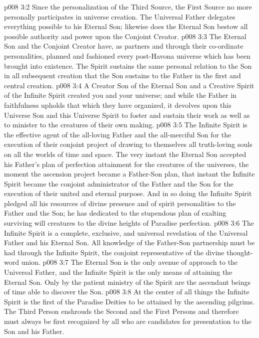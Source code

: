 \vs p008 3:2 Since the personalization of the Third Source, the First Source no more personally participates in universe creation. The Universal Father delegates everything possible to his Eternal Son; likewise does the Eternal Son bestow all possible authority and power upon the Conjoint Creator.
\vs p008 3:3 The Eternal Son and the Conjoint Creator have, as partners and through their co\hyp{}ordinate personalities, planned and fashioned every post\hyp{}Havona universe which has been brought into existence. The Spirit sustains the same personal relation to the Son in all subsequent creation that the Son sustains to the Father in the first and central creation.
\vs p008 3:4 A Creator Son of the Eternal Son and a Creative Spirit of the Infinite Spirit created you and your universe; and while the Father in faithfulness upholds that which they have organized, it devolves upon this Universe Son and this Universe Spirit to foster and sustain their work as well as to minister to the creatures of their own making.
\pc \vs p008 3:5 The Infinite Spirit is the effective agent of the all\hyp{}loving Father and the all\hyp{}merciful Son for the execution of their conjoint project of drawing to themselves all truth\hyp{}loving souls on all the worlds of time and space. The very instant the Eternal Son accepted his Father’s plan of perfection attainment for the creatures of the universes, the moment the ascension project became a Father\hyp{}Son plan, that instant the Infinite Spirit became the conjoint administrator of the Father and the Son for the execution of their united and eternal purpose. And in so doing the Infinite Spirit pledged all his resources of divine presence and of spirit personalities to the Father and the Son; he has dedicated  to the stupendous plan of exalting surviving will creatures to the divine heights of Paradise perfection.
\vs p008 3:6 The Infinite Spirit is a complete, exclusive, and universal revelation of the Universal Father and his Eternal Son. All knowledge of the Father\hyp{}Son partnership must be had through the Infinite Spirit, the conjoint representative of the divine thought\hyp{}word union.
\vs p008 3:7 The Eternal Son is the only avenue of approach to the Universal Father, and the Infinite Spirit is the only means of attaining the Eternal Son. Only by the patient ministry of the Spirit are the ascendant beings of time able to discover the Son.
\vs p008 3:8 At the center of all things the Infinite Spirit is the first of the Paradise Deities to be attained by the ascending pilgrims. The Third Person enshrouds the Second and the First Persons and therefore must always be first recognized by all who are candidates for presentation to the Son and his Father.
